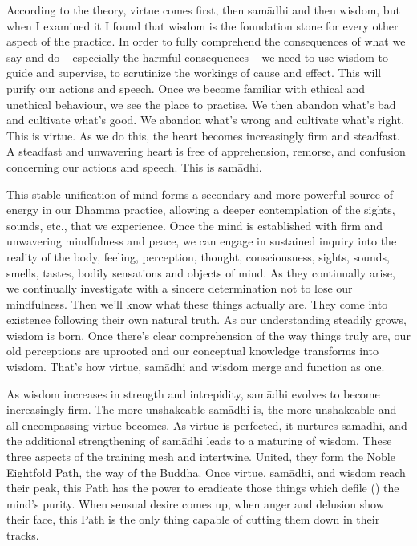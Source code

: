 According to the theory, virtue comes first, then sam\=adhi and then wisdom, but when I examined it I found that wisdom is the foundation stone for every other aspect of the practice. In order to fully comprehend the consequences of what we say and do -- especially the harmful consequences -- we need to use wisdom to guide and supervise, to scrutinize the workings of cause and effect. This will purify our actions and speech. Once we become familiar with ethical and unethical behaviour, we see the place to practise. We then abandon what's bad and cultivate what's good. We abandon what's wrong and cultivate what's right. This is virtue. As we do this, the heart becomes increasingly firm and steadfast. A steadfast and unwavering heart is free of apprehension, remorse, and confusion concerning our actions and speech. This is sam\=adhi.

This stable unification of mind forms a secondary and more powerful source of energy in our Dhamma practice, allowing a deeper contemplation of the sights, sounds, etc., that we experience. Once the mind is established with firm and unwavering mindfulness and peace, we can engage in sustained inquiry into the reality of the body, feeling, perception, thought, consciousness, sights, sounds, smells, tastes, bodily sensations and objects of mind. As they continually arise, we continually investigate with a sincere determination not to lose our mindfulness. Then we'll know what these things actually are. They come into existence following their own natural truth. As our understanding steadily grows, wisdom is born. Once there's clear comprehension of the way things truly are, our old perceptions are uprooted and our conceptual knowledge transforms into wisdom. That's how virtue, sam\=adhi and wisdom merge and function as one.

As wisdom increases in strength and intrepidity, sam\=adhi evolves to become increasingly firm. The more unshakeable sam\=adhi is, the more unshakeable and all-encompassing virtue becomes. As virtue is perfected, it nurtures sam\=adhi, and the additional strengthening of sam\=adhi leads to a maturing of wisdom. These three aspects of the training mesh and intertwine. United, they form the Noble Eightfold Path, the way of the Buddha. Once virtue, sam\=adhi, and wisdom reach their peak, this Path has the power to eradicate those things which defile () the mind's purity. When sensual desire comes up, when anger and delusion show their face, this Path is the only thing capable of cutting them down in their tracks.


